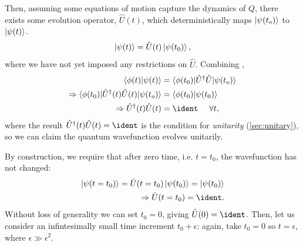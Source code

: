 Then, assuming some equations of motion capture the dynamics of $Q$, 
    there exists some evolution operator, $\hat{U}(t)$, which deterministically maps $\ket{\psi(t_o)}$ to $\ket{\psi(t)}$.
\begin{equation}
    \label{eqn:unitary_time_evolution}
    \ket{\psi(t)} = \hat{U}(t) \ket{\psi(t_0)},
\end{equation}
    where we have not yet imposed any restrictions on $\hat{U}$. 
Combining , 
\begin{equation}
    \begin{split}
        \braket{\phi(t) | \psi(t)} &= \braket{ \phi(t_0) | \hat{U}^{\dag} \hat{U}| \psi(t_o) }
        \\
        \Rightarrow \braket{ \phi(t_0) | \hat{U}^{\dag}(t) \hat{U}(t) | \psi(t_o) } &= \braket{\phi(t_0) | \psi(t_0)}
        \\
        \Rightarrow \hat{U}^{\dag}(t) \hat{U}(t) &= \ident \ \ \ \ \forall t,
    \end{split}
\end{equation}
where the result $\hat{U}^{\dag}(t) \hat{U}(t) = \ident$ is the condition for \emph{unitarity} (\cref{sec:unitary}), 
    so we can claim the quantum wavefunction evolves unitarily. 
\par 

By construction, we require that after zero time, i.e. $t = t_0$, the wavefunction has not changed:
\begin{equation}
    \begin{split}
        \ket{\psi(t = t_0)} = \hat{U}(t = t_0)\ket{\psi(t_0)} = \ket{\psi(t_0)}
        \\ \Rightarrow \hat{U}(t = t_0) = \ident.
    \end{split}
\end{equation}
Without loss of generality we can set $t_0 = 0$, giving $\hat{U}(0) = \ident$. 
Then, let us consider an infintesimally small time increment $t_0 + \epsilon$:
    again, take $t_0 = 0$ so $t = \epsilon$,  where $\epsilon \gg \epsilon^2$. 

